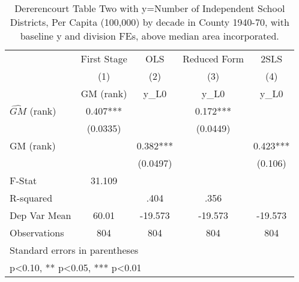 \begin{table}[htbp]\centering
\def\sym#1{\ifmmode^{#1}\else\(^{#1}\)\fi}
\caption{Dererencourt Table Two with y=Number of Independent School Districts, Per Capita (100,000) by decade in County 1940-70, with baseline y and division FEs, above median area incorporated.}
\begin{tabular}{l*{4}{c}}
\toprule
                    & First Stage   &         OLS   &Reduced Form   &        2SLS   \\
                    &\multicolumn{1}{c}{(1)}&\multicolumn{1}{c}{(2)}&\multicolumn{1}{c}{(3)}&\multicolumn{1}{c}{(4)}\\
                    &\multicolumn{1}{c}{GM  (rank)}&\multicolumn{1}{c}{y\_L0}&\multicolumn{1}{c}{y\_L0}&\multicolumn{1}{c}{y\_L0}\\
\midrule
$\hat{GM}$ (rank)   &       0.407***&               &       0.172***&               \\
                    &    (0.0335)   &               &    (0.0449)   &               \\
\addlinespace
GM  (rank)          &               &       0.382***&               &       0.423***\\
                    &               &    (0.0497)   &               &     (0.106)   \\
\midrule
F-Stat              &      31.109   &               &               &               \\
R-squared           &               &        .404   &        .356   &               \\
Dep Var Mean        &       60.01   &     -19.573   &     -19.573   &     -19.573   \\
Observations        &         804   &         804   &         804   &         804   \\
\bottomrule
\multicolumn{5}{l}{\footnotesize Standard errors in parentheses}\\
\multicolumn{5}{l}{\footnotesize * p<0.10, ** p<0.05, *** p<0.01}\\
\end{tabular}
\end{table}
